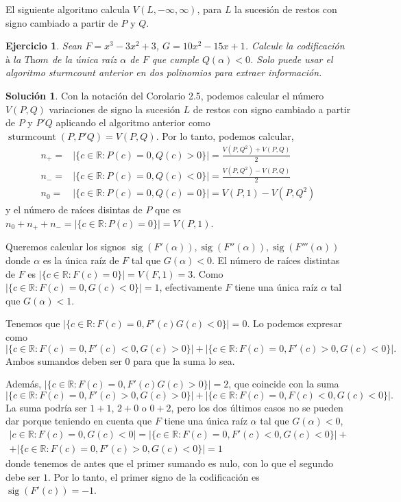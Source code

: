 \documentclass[10pt]{article}
\newtheorem{ejer}{Ejercicio}
\theoremstyle{definition}
\newtheorem*{sol}{Solución}
\newcommand{\RR}{\mathbb{R}}
\newcommand{\sig}{\operatorname{sig}}
\newcommand{\stc}{\operatorname{sturmcount}}
\begin{document}
El siguiente algoritmo calcula $V(L,-\infty,\infty)$, para $L$ la sucesión de restos con signo cambiado a partir de $P$ y $Q$.


\begin{ejer} Sean $F=x^3-3x^2+3$, $G=10x^2-15x+1$. Calcule la codificación $\textit{à la Thom}$ de la única raíz $\alpha$ de $F$ que cumple $Q(\alpha)<0$. Solo puede usar el algoritmo sturmcount anterior en dos polinomios para extraer información.
\end{ejer}
\begin{sol} Con la notación del Corolario 2.5, podemos calcular el número $V(P,Q)$ variaciones de signo la sucesión $L$ de restos con signo cambiado a partir de $P$ y $P'Q$ aplicando el algoritmo anterior como $\stc(P,P'Q)=V(P,Q)$. Por lo tanto, podemos calcular,
\begin{align*}
n_+ = & |\{c\in\RR : P(c)=0, Q(c)>0\}|=\frac{V(P,Q^2)+V(P,Q)}{2} \\
n_- = & |\{c\in\RR: P(c)=0, Q(c)<0\}|=\frac{V(P,Q^2)-V(P,Q)}{2}\\
n_0  = & |\{c\in\RR : P(c)=0, Q(c)=0\}|=V(P,1)-V(P,Q^2)
\end{align*}
y el número de raíces disintas de $P$ que es $n_0+n_++n_- = |\{c\in\RR: P(c)=0\}|=V(P,1)$.

Queremos calcular los signos $\sig(F'(\alpha)), \sig(F''(\alpha)), \sig(F'''(\alpha))$ donde $\alpha$ es la única raíz de $F$ tal que $G(\alpha)<0$.
El número de raíces distintas de $F$ es $|\{c\in\RR: F(c) = 0\}|=V(F,1) = 3$. Como $|\{c\in \RR: F(c)=0, G(c)<0\}|=1$, efectivamente $F$ tiene una única raíz $\alpha$ tal que $G(\alpha)<1$.

Tenemos que $|\{c\in\RR : F(c)=0, F'(c)G(c)<0\}|=0$. Lo podemos expresar como
\[|\{c\in\RR: F(c)=0, F'(c)<0, G(c)>0\}|+|\{c\in\RR: F(c)=0, F'(c)>0, G(c)<0\}|.\]
Ambos sumandos deben ser $0$ para que la suma lo sea.

Además, $|\{c\in\RR: F(c)=0, F'(c)G(c)>0\}|=2$, que coincide con la suma
\[|\{c\in\RR : F(c)=0, F'(c)>0, G(c)>0\}|+|\{c\in\RR : F(c)=0, F(c)<0, G(c)<0\}|.\]
La suma podría ser $1+1$, $2+0$ o $0+2$, pero los dos últimos casos no se pueden dar porque teniendo en cuenta que $F$ tiene una única raíz $\alpha$ tal que $G(\alpha)<0$,
\begin{multline*}
|c\in\RR : F(c)=0, G(c)<0| = |\{c\in\RR: F(c)=0, F'(c)<0, G(c)<0\}|+\\+|\{c\in\RR: F(c)=0, F'(c)>0, G(c)<0\}| = 1
\end{multline*}
donde tenemos de antes que el primer sumando es nulo, con lo que el segundo debe ser $1$. Por lo tanto, el primer signo de la codificación es $\sig(F'(c))=-1$.


\end{sol}
\end{document}
